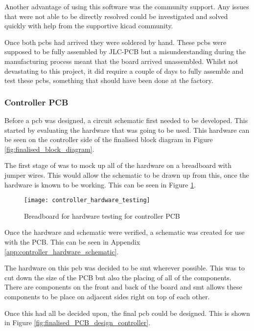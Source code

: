 \documentclass [12pt]{article}
\begin{document}
Another advantage of using this software was the community support. Any issues that were not able to be directly resolved could be investigated and solved quickly with help from the supportive \gls{kicad} community. 

Once both \gls{pcb}s had arrived they were soldered by hand. These \gls{pcb}s were supposed to be fully assembled by JLC-PCB but a misunderstanding during the manufacturing process meant that the board arrived unassembled. Whilst not devastating to this project, it did require a couple of days to fully assemble and test these \gls{pcb}s, something that should have been done at the factory.   


\subsubsection{Controller PCB}

Before a \gls{pcb} was designed, a circuit schematic first needed to be developed. This started by evaluating the hardware that was going to be used. This hardware can be seen on the controller side of the finalised block diagram in Figure \ref{fig:finalised_block_diagram}.

The first stage of was to mock up all of the hardware on a breadboard with jumper wires. This would allow the schematic to be drawn up from this, once the hardware is known to be working. This can be seen in Figure \ref{fig:controller_hardware_testing}.

\begin{figure}[H]
\centerline{\texttt{[image: controller\_hardware\_testing]}}
\caption{Breadboard for hardware testing for controller PCB}
\label{fig:controller_hardware_testing}
\end{figure}

Once the hardware and schematic were verified, a schematic was created for use with the PCB. This can be seen in Appendix \ref{app:controller_hardware_schematic}.

The hardware on this \gls{pcb} was decided to be \gls{smt} wherever possible. This was to cut down the size of the PCB but also the placing of all of the components. There are components on the front and back of the board and \gls{smt} allows these components to be place on adjacent sides right on top of each other. 

Once this had all be decided upon, the final \gls{pcb} could be designed. This is shown in Figure \ref{fig:finalised_PCB_design_controller}.
\end{document}
